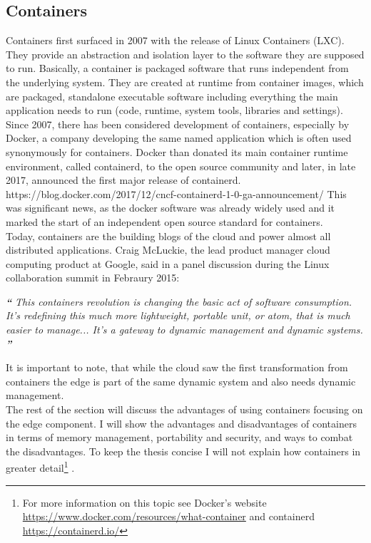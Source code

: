\subsection{Containers}
Containers first surfaced in 2007 with the release of Linux Containers (LXC). They provide an abstraction and isolation layer to the software they are supposed to run. Basically, a container is packaged software that runs independent from the underlying system. They are created at runtime from container images, which are packaged, standalone executable software including everything the main application needs to run (code, runtime, system tools, libraries and settings)\cite{containerDefinition:online}. Since 2007, there has been considered development of containers, especially by Docker, a company developing the same named application which is often used synonymously for containers. Docker than donated its main container runtime environment, called containerd, to the open source community and later, in late 2017, announced the first major release of containerd. https://blog.docker.com/2017/12/cncf-containerd-1-0-ga-announcement/ This was significant news, as the docker software was already widely used and it marked the start of an independent open source standard for containers. \\
Today, containers are the building blogs of the cloud and power almost all distributed applications. Craig McLuckie, the lead product manager cloud computing product at Google, said in a panel discussion during the Linux collaboration summit in Febraury 2015:
\begin{displayquote}
\textit{\textbf{\large{``}}}
\textit{This containers revolution is changing the basic act of software consumption. It’s redefining this much more lightweight, portable unit, or atom, that is much easier to manage... It’s a gateway to dynamic management and dynamic systems.}
\textit{\textbf{\large{''}}}
\end{displayquote}
It is important to note, that while the cloud saw the first transformation from containers the edge is part of the same dynamic system and also needs dynamic management.\\ 
The rest of the section will discuss the advantages of using containers focusing on the edge component. I will show the advantages and disadvantages of containers in terms of memory management, portability and security, and ways to combat the disadvantages. To keep the thesis concise I will not explain how containers in greater detail\footnote{For more information on this topic see Docker's website  \url{https://www.docker.com/resources/what-container} and containerd \url{https://containerd.io/}} .







